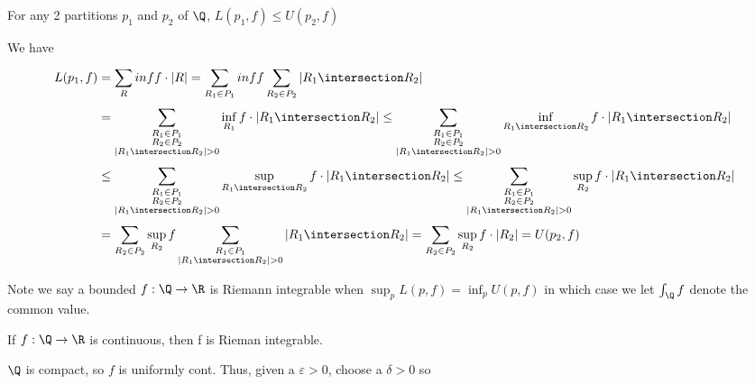 \begin{lemma}
	For any 2 partitions $p_1$ and $p_2$ of  $\Q$,  $L(p_1,f) \leq U(p_2, f)$
\end{lemma}

\begin{solution}
	We have
	\begin{align*}
		L(p_1, f) &= \sum_{R}^{}  inf f \cdot |R| = \sum_{R_1 \in P_1}^{} inf f 
		\sum_{R_2 \in P_2}^{} |R_1 \intersection R_2 | \\
				  &= \sum_{\substack{R_1 \in P_1 \\ R_2 \in P_2 \\ |R_1 \intersection R_2 | > 0} }^{} \inf_{R_1} f \cdot |R_1 \intersection R_2 | 
				  \leq \sum_{\substack{R_1 \in P_1 \\ R_2 \in P_2 \\ |R_1 \intersection R_2 | > 0} }^{} \inf_{R_1 \intersection R_2} f \cdot |R_1 \intersection R_2 | \\
				  &\leq \sum_{\substack{R_1 \in P_1 \\ R_2 \in P_2 \\ |R_1 \intersection R_2 | > 0} }^{} \sup_{R_1 \intersection R_2} f \cdot |R_1 \intersection R_2 |
				  \leq \sum_{\substack{R_1 \in P_1 \\ R_2 \in P_2 \\ |R_1 \intersection R_2 | > 0} }^{} \sup_{R_2} f \cdot |R_1 \intersection R_2 | \\
				  &= \sum_{R_2 \in P_2}^{} \sup_{R_2} f \sum_{\substack{R_1 \in P_1 \\ |R_1 \intersection R_2 | > 0}}^{} |R_1 \intersection R_2 |  = \sum_{R_2 \in P_2}^{} \sup_{R_2} f \cdot |R_2| = U(p_2, f)
	\end{align*} 
\end{solution}


Note we say a bounded $f : \Q \to \R$ is Riemann integrable when  $\sup_p L(p,f) = \inf_p U(p,f)$ in which case we let  $\int_{\Q} f$ denote the common value.


\begin{theorem}
	If $f : \Q \to \R$	 is continuous, then f is Rieman integrable.
\end{theorem}

\begin{solution}
	$\Q$ is compact, so  $f$ is uniformly cont. Thus, given a $\varepsilon >0 $, choose a $\delta >0$ so  $$
\end{solution}


